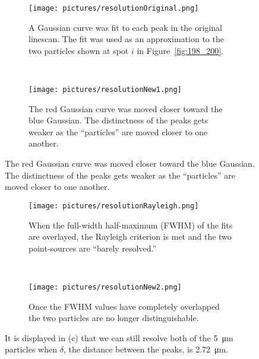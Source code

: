 \begin{figure}[ht!]
    \begin{center}

        \begin{subfigure}[t]{\textwidth}
            \label{fig:linescan_original}
            \texttt{[image: pictures/resolutionOriginal.png]}
            \caption{A Gaussian curve was fit to each peak in the original linescan.
                The fit was used as an approximation to the two particles shown
            at spot $i$ in Figure~\ref{fig:198_200}.}
        \end{subfigure}
        \\
        \begin{subfigure}[t]{\textwidth}
            \label{fig:linescan_new1}
            \texttt{[image: pictures/resolutionNew1.png]}
            \caption{The red Gaussian curve was moved closer toward the blue
            Gaussian. The distinctness of the peaks gets weaker as the
        ``particles'' are moved closer to one another.}
        \end{subfigure}

    \end{center}
\end{figure}

\begin{figure}[ht!]
    \ContinuedFloat
    \begin{center}
        \begin{subfigure}[t]{\textwidth}
            \label{fig:linescan_rayleigh}
            \texttt{[image: pictures/resolutionRayleigh.png]}
            \caption{When the full-width half-maximum (FWHM) of the fits are
            overlayed, the Rayleigh criterion is met and the two point-sources are
            ``barely resolved.'' \cite{Goodman}}
        \end{subfigure}
        \\
        \begin{subfigure}[t]{\textwidth}
            \label{fig:linescan_new2}
            \texttt{[image: pictures/resolutionNew2.png]}
            \caption{Once the FWHM values have completely overlapped the two
            particles are no longer distinguishable.}
        \end{subfigure}

    \end{center}
    \caption{%
        It is displayed in (c) that we can still resolve both of the
        \SI{5}{\micro\meter} particles when $\delta$, the distance between the
        peaks, is
        \SI{2.72}{\micro\meter}.
    }%
    \label{fig:linescan}

\end{figure}

